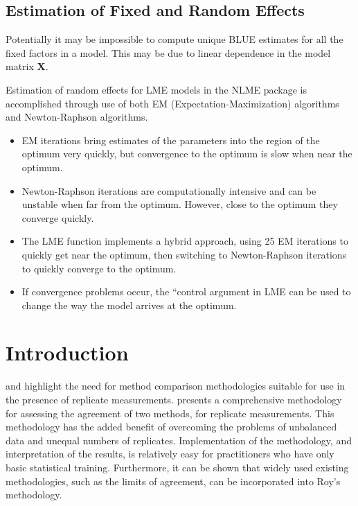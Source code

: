 \documentclass[12pt, a4paper]{report}
\theoremstyle{plain}
\theoremstyle{definition}
\theoremstyle{remark}
\begin{document}
	
	
	


	\subsection{Estimation of Fixed and Random Effects}
		Potentially it may be impossible to compute unique BLUE estimates for all the fixed factors in a model. This may be due to linear dependence in the model
		matrix \textbf{X}. 
		
	Estimation of random effects for LME models in the NLME package is accomplished through use
	of both EM (Expectation-Maximization) algorithms and Newton-Raphson algorithms.
	\begin{itemize}
		\item EM iterations bring estimates of the parameters into the region of the optimum very quickly, but
		convergence to the optimum is slow when near the optimum.
		\item Newton-Raphson iterations are computationally intensive and can be unstable when far from the
		optimum. However, close to the optimum they converge quickly.
		\item The LME function implements a hybrid approach, using 25 EM iterations to quickly get near the
		optimum, then switching to Newton-Raphson iterations to quickly converge to the optimum. \item If
		convergence problems occur, the ``control argument in LME can be used to change the way the
		model arrives at the optimum.
	\end{itemize}
	
	


	
	\section{Introduction}
%
\citet{BXC2008} and \citet{ARoy2009} highlight the need for method comparison methodologies suitable for use in the presence of replicate measurements. \citet{ARoy2009} presents a comprehensive methodology for assessing the agreement of two methods, for replicate measurements. This methodology has the added benefit of overcoming the problems of unbalanced data and unequal numbers of replicates. Implementation of the methodology, and interpretation of the results, is relatively easy for practitioners who have only basic statistical training. Furthermore, it can be shown that widely used existing methodologies, such as the limits of agreement, can be incorporated into Roy's methodology.
\end{document}
